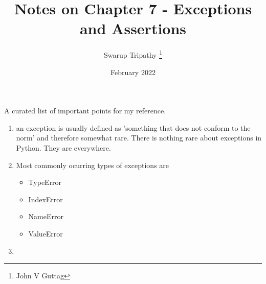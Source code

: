 \documentclass[11pt]{article}
\title{Notes on Chapter 7 - Exceptions and Assertions}
\author{Swarup Tripathy \thanks{John V Guttag}}
\date{February 2022}
\begin{document}
    \maketitle
    A curated list of important points for my reference.\\
    \begin{enumerate}
        \item an exception is usually defined as 'something that does not conform to the norm' and therefore somewhat rare. There is nothing rare about exceptions in Python. They are everywhere.
        \item Most commonly ocurring types of exceptions are 
        \begin{itemize}
            \item TypeError
            \item IndexError
            \item NameError
            \item ValueError
        \end{itemize}
        \item 
    \end{enumerate}
\end{document}
